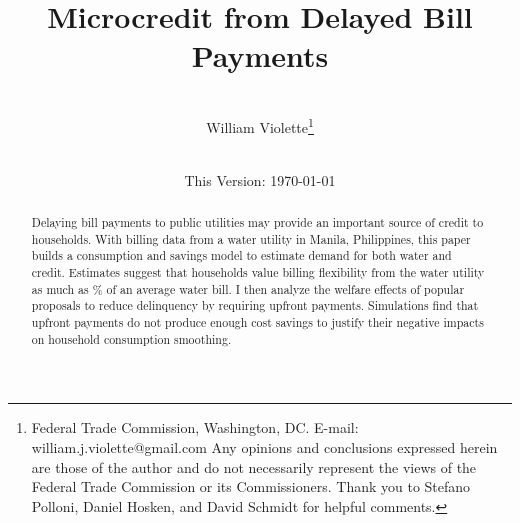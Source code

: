 \documentclass[12pt]{article}
\begin{document}
\begin{titlepage} 
\title{{Microcredit from Delayed Bill Payments}}
\author{\\[3em]
  William Violette\thanks{Federal Trade Commission, Washington, DC. E-mail: william.j.violette@gmail.com   Any opinions and conclusions expressed herein are those of the author and do not necessarily represent the views of the Federal Trade Commission or its Commissioners.  Thank you to Stefano Polloni, Daniel Hosken, and David Schmidt for helpful comments.} \\
 \\ 
  }
\vspace{30mm}
\date{\vspace{5mm}This Version: \today}
\maketitle
\begin{abstract}



Delaying bill payments to public utilities may provide an important source of credit to households.  With billing data from a water utility in Manila, Philippines, this paper builds a consumption and savings model to estimate demand for both water and credit.  Estimates suggest that households value billing flexibility from the water utility as much as \unskip\% of an average water bill.  I then analyze the welfare effects of popular proposals to reduce delinquency by requiring upfront payments.  Simulations find that upfront payments do not produce enough cost savings to justify their negative impacts on household consumption smoothing.





\end{abstract}
\end{titlepage}
\end{document}

